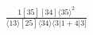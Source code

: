 \documentclass[varwidth, border=5pt]{standalone}
\begin{document}
\begin{my}
$\begin{gathered}
\scriptscriptstyle\frac{1[35][34]⟨35⟩^2}{⟨13⟩[25]⟨34⟩⟨3|1+4|3]}
\end{gathered}$
\end{my}
\end{document}
